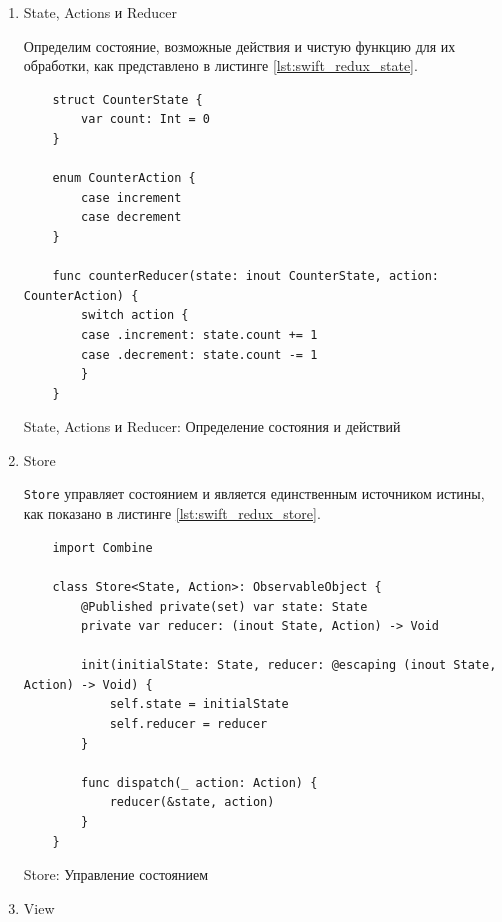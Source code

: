 \documentclass[14pt, russian]{scrartcl}
\begin{document}
\begin{enumerate}
    \item State, Actions и Reducer

    Определим состояние, возможные действия и чистую функцию для их обработки, как представлено в листинге \ref{lst:swift_redux_state}.

    \begin{listing}[H]
    \begin{verbatim}
    struct CounterState {
        var count: Int = 0
    }

    enum CounterAction {
        case increment
        case decrement
    }

    func counterReducer(state: inout CounterState, action: CounterAction) {
        switch action {
        case .increment: state.count += 1
        case .decrement: state.count -= 1
        }
    }
    \end{verbatim}
    \caption{State, Actions и Reducer: Определение состояния и действий}
    \label{lst:swift_redux_state}
    \end{listing}

    \item Store

    \texttt{Store} управляет состоянием и является единственным источником истины, как показано в листинге \ref{lst:swift_redux_store}.

    \begin{listing}[H]
    \begin{verbatim}
    import Combine

    class Store<State, Action>: ObservableObject {
        @Published private(set) var state: State
        private var reducer: (inout State, Action) -> Void

        init(initialState: State, reducer: @escaping (inout State, Action) -> Void) {
            self.state = initialState
            self.reducer = reducer
        }

        func dispatch(_ action: Action) {
            reducer(&state, action)
        }
    }
    \end{verbatim}
    \caption{Store: Управление состоянием}
    \label{lst:swift_redux_store}
    \end{listing}

    \item View


\end{enumerate}
\end{document}
